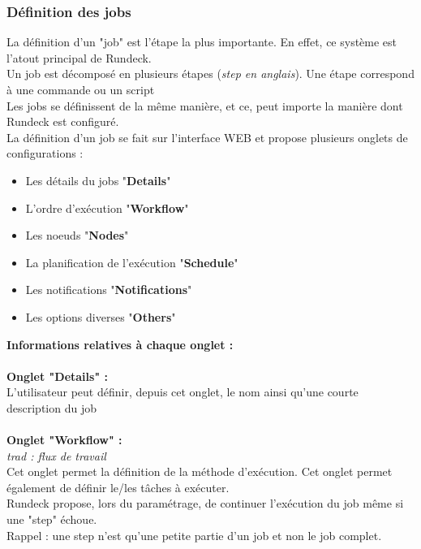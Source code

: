 \documentclass[12pt]{article}
\begin{document}
\subsubsection{Définition des jobs}
La définition d'un "job" est l'étape la plus importante. En effet, ce système est l'atout principal de Rundeck.
\\
Un job est décomposé en plusieurs étapes (\textit{step en anglais}). Une étape correspond à une commande ou un script
\\
Les jobs se définissent de la même manière, et ce, peut importe la manière dont Rundeck est configuré.
\\
La définition d'un job se fait sur l'interface WEB et propose plusieurs onglets de configurations :

\begin{itemize}
    \item Les détails du jobs "\textbf{Details}"
    \item L'ordre d'exécution "\textbf{Workflow}"
    \item Les noeuds "\textbf{Nodes}"
    \item La planification de l'exécution "\textbf{Schedule}"
    \item Les notifications "\textbf{Notifications}"
    \item Les options diverses "\textbf{Others}"
\end{itemize}
\vspace{0.5cm}
\textbf{Informations relatives à chaque onglet :}
\\
\vspace{0.5cm}
\\
\textbf{Onglet "Details" :}
\\
L'utilisateur peut définir, depuis cet onglet, le nom ainsi qu'une courte description du job
\\
\vspace{0.2cm}
\\
\textbf{Onglet "Workflow" :}
\\
\textit{trad : flux de travail}
\\
Cet onglet permet la définition de la méthode d'exécution. Cet onglet permet également de définir le/les tâches à exécuter.
\\
Rundeck propose, lors du paramétrage, de continuer l'exécution du job même si une "step" échoue. 
\\
Rappel : une step n'est qu'une petite partie d'un job et non le job complet.
\vspace{0.5cm}
\\
\end{document}
